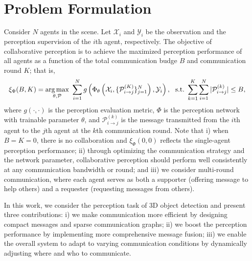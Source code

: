 \vspace{-3mm}
\section{Problem Formulation}
\label{sec:ProblemForm}
\vspace{-2mm}
Consider $N$ agents in the scene. Let $\mathcal{X}_i$ and $\mathcal{Y}_i$ be the observation and the perception supervision of the $i$th agent, respectively. The objective of collaborative perception is to achieve the maximized perception performance of all agents as a function of the total communication budge $B$ and communication round $K$; that is,
\vspace{-1mm}
\begin{equation*}
    {\xi}_{\Phi}(B, K) = \underset{\theta,\mathcal{P}}{\arg \max}~\sum_{i=1}^{N} 
    g \left(\Phi_{\theta} \left(\mathcal{X}_i,\{\mathcal{P}_{i\rightarrow j}^{(K)}\}_{j=1}^N \right), \mathcal{Y}_i  \right),~
    ~{\rm s.t.~} \sum_{k=1}^{K} \sum_{i=1}^{N}|\mathcal{P}_{i\rightarrow j}^{(k)}| \leq B,
\vspace{-1mm}
\end{equation*}
where $g(\cdot,\cdot)$ is the perception evaluation metric, $\Phi$ is the perception network with trainable parameter $\theta$, and $\mathcal{P}_{i\rightarrow j}^{(k)}$ is the message transmitted from the $i$th agent to the $j$th agent at the $k$th communication round. Note that i) when $B=K=0$, there is no collaboration and ${\xi}_{\Phi}(0, 0)$ reflects the single-agent perception performance; ii) through optimizing the communication strategy and the network parameter, collaborative perception should perform well consistently at any communication bandwidth or round; and iii) we consider multi-round communication, where each agent serves as both a supporter (offering message to help others) and a requester (requesting messages from others).



In this work, we consider the perception task of 3D object detection and present three contributions: i) we make communication more efficient by designing compact messages and sparse communication graphs; ii) we boost the perception performance by implementing more comprehensive message fusion; iii) we enable the overall system to adapt to varying communication conditions by dynamically adjusting where and who to communicate.



